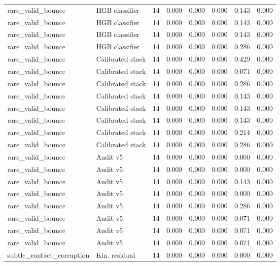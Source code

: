 {\begin{longtable}{llrrrrrr}
rare\_valid\_bounce & HGB classifier & 14 & 0.000 & 0.000 & 0.000 & 0.143 & 0.000 \\
rare\_valid\_bounce & HGB classifier & 14 & 0.000 & 0.000 & 0.000 & 0.143 & 0.000 \\
rare\_valid\_bounce & HGB classifier & 14 & 0.000 & 0.000 & 0.000 & 0.143 & 0.000 \\
rare\_valid\_bounce & HGB classifier & 14 & 0.000 & 0.000 & 0.000 & 0.286 & 0.000 \\
rare\_valid\_bounce & Calibrated stack & 14 & 0.000 & 0.000 & 0.000 & 0.429 & 0.000 \\
rare\_valid\_bounce & Calibrated stack & 14 & 0.000 & 0.000 & 0.000 & 0.071 & 0.000 \\
rare\_valid\_bounce & Calibrated stack & 14 & 0.000 & 0.000 & 0.000 & 0.286 & 0.000 \\
rare\_valid\_bounce & Calibrated stack & 14 & 0.000 & 0.000 & 0.000 & 0.143 & 0.000 \\
rare\_valid\_bounce & Calibrated stack & 14 & 0.000 & 0.000 & 0.000 & 0.143 & 0.000 \\
rare\_valid\_bounce & Calibrated stack & 14 & 0.000 & 0.000 & 0.000 & 0.143 & 0.000 \\
rare\_valid\_bounce & Calibrated stack & 14 & 0.000 & 0.000 & 0.000 & 0.214 & 0.000 \\
rare\_valid\_bounce & Calibrated stack & 14 & 0.000 & 0.000 & 0.000 & 0.286 & 0.000 \\
rare\_valid\_bounce & Audit v5 & 14 & 0.000 & 0.000 & 0.000 & 0.000 & 0.000 \\
rare\_valid\_bounce & Audit v5 & 14 & 0.000 & 0.000 & 0.000 & 0.000 & 0.000 \\
rare\_valid\_bounce & Audit v5 & 14 & 0.000 & 0.000 & 0.000 & 0.143 & 0.000 \\
rare\_valid\_bounce & Audit v5 & 14 & 0.000 & 0.000 & 0.000 & 0.000 & 0.000 \\
rare\_valid\_bounce & Audit v5 & 14 & 0.000 & 0.000 & 0.000 & 0.286 & 0.000 \\
rare\_valid\_bounce & Audit v5 & 14 & 0.000 & 0.000 & 0.000 & 0.071 & 0.000 \\
rare\_valid\_bounce & Audit v5 & 14 & 0.000 & 0.000 & 0.000 & 0.071 & 0.000 \\
rare\_valid\_bounce & Audit v5 & 14 & 0.000 & 0.000 & 0.000 & 0.071 & 0.000 \\
subtle\_contact\_corruption & Kin. residual & 14 & 0.000 & 0.000 & 0.000 & 0.000 & 0.000 \\

\end{longtable}}
